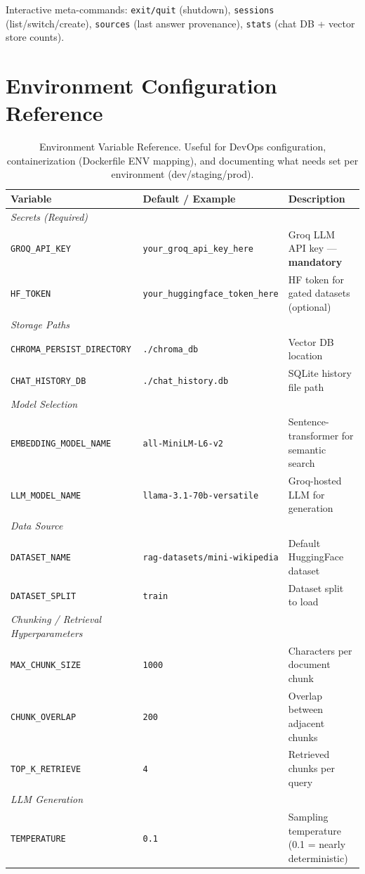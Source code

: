 \documentclass[12pt,a4paper]{article}
\begin{document}
Interactive meta-commands: \texttt{exit/quit} (shutdown), \texttt{sessions} (list/switch/create), \texttt{sources} (last answer provenance), \texttt{stats} (chat DB + vector store counts).

\newpage

\section{Environment Configuration Reference}

\begin{table}[H]
\centering
\footnotesize
\begin{tabular}{@{}lll@{}}
\toprule
\textbf{Variable} & \textbf{Default / Example} & \textbf{Description} \\
\midrule
\textit{Secrets (Required)} && \\
\quad \texttt{GROQ\_API\_KEY} & \texttt{your\_groq\_api\_key\_here} & Groq LLM API key — \textbf{mandatory} \\
\quad \texttt{HF\_TOKEN} & \texttt{your\_huggingface\_token\_here} & HF token for gated datasets (optional) \\
\midrule
\textit{Storage Paths} && \\
\quad \texttt{CHROMA\_PERSIST\_DIRECTORY} & \texttt{./chroma\_db} & Vector DB location \\
\quad \texttt{CHAT\_HISTORY\_DB} & \texttt{./chat\_history.db} & SQLite history file path \\
\midrule
\textit{Model Selection} && \\
\quad \texttt{EMBEDDING\_MODEL\_NAME} & \texttt{all-MiniLM-L6-v2} & Sentence-transformer for semantic search \\
\quad \texttt{LLM\_MODEL\_NAME} & \texttt{llama-3.1-70b-versatile} & Groq-hosted LLM for generation \\
\midrule
\textit{Data Source} && \\
\quad \texttt{DATASET\_NAME} & \texttt{rag-datasets/mini-wikipedia} & Default HuggingFace dataset \\
\quad \texttt{DATASET\_SPLIT} & \texttt{train} & Dataset split to load \\
\midrule
\textit{Chunking / Retrieval Hyperparameters} && \\
\quad \texttt{MAX\_CHUNK\_SIZE} & \texttt{1000} & Characters per document chunk \\
\quad \texttt{CHUNK\_OVERLAP} & \texttt{200} & Overlap between adjacent chunks \\
\quad \texttt{TOP\_K\_RETRIEVE} & \texttt{4} & Retrieved chunks per query \\
\midrule
\textit{LLM Generation} && \\
\quad \texttt{TEMPERATURE} & \texttt{0.1} & Sampling temperature (0.1 = nearly deterministic) \\
\bottomrule
\end{tabular}
\caption{Environment Variable Reference. Useful for DevOps configuration, containerization (Dockerfile ENV mapping), and documenting what needs set per environment (dev/staging/prod).}
\end{table}
\end{document}
